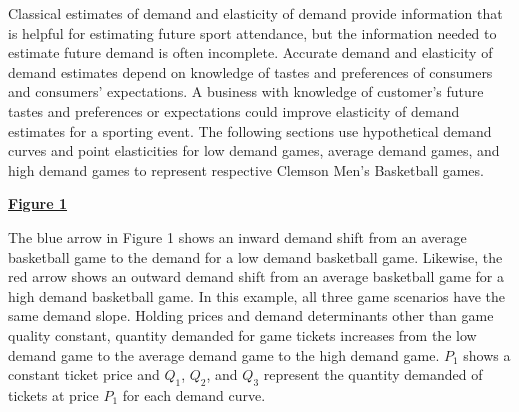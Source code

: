 \documentclass[preprint,12pt,times]{elsarticle}
\begin{document}
Classical estimates of demand and elasticity of demand provide information that is helpful for estimating future sport attendance, but the information needed to estimate future demand is often incomplete.  Accurate demand and elasticity of demand estimates depend on knowledge of tastes and preferences of consumers and consumers' expectations.  A business with knowledge of customer's future tastes and preferences or expectations could improve elasticity of demand estimates for a sporting event.  The following sections use hypothetical demand curves and point elasticities for low demand games, average demand games, and high demand games to represent respective Clemson Men's Basketball games.\\

\begin{large}
\ul{\textbf{Figure 1}}
\end{large}

\begin{flushleft}
\end{flushleft}

The blue arrow in Figure 1 shows an inward demand shift from an average basketball game to the demand for a low demand basketball game.  Likewise, the red arrow shows an outward demand shift from an average basketball game for a high demand basketball game.  In this example, all three game scenarios have the same demand slope.  Holding prices and demand determinants other than game quality constant, quantity demanded for game tickets increases from the low demand game to the average demand game to the high demand game.  $P_1$ shows a constant ticket price and $Q_1$, $Q_2$, and $Q_3$ represent the quantity demanded of tickets at price $P_1$ for each demand curve.
\end{document}
